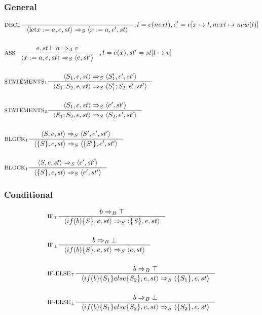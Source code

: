 \subsubsection{General}
\begin{align*}
&\inference[$\text{DECL}$]{}
                         {\Braket{\Tlet x := a,e,st} \Rightarrow_S \Braket{x := a, e',st}}
												{, l = e(next), e' = e[x\mapsto l, next\mapsto new(l)]}
\\\\
&\inference[$\text{ASS}$]{e,st \vdash a \Rightarrow_A v}
                         {\Braket{x := a,e,st} \Rightarrow_S \Braket{e,st'}}
												{, l = e(x), st' = st[l\mapsto v]}
\\\\
&\inference[$\text{STATEMENTS}_1$]{\Braket{S_1,e,st} \Rightarrow_S \Braket{S_1',e',st'}}
                         {\Braket{S_1;S_2,e,st} \Rightarrow_S \Braket{S_1';S_2,e',st'}}
\\\\
&\inference[$\text{STATEMENTS}_2$]{\Braket{S_1,e,st} \Rightarrow_S \Braket{e',st'}}
                         {\Braket{S_1;S_2,e,st} \Rightarrow_S \Braket{S_2,e',st'}}
\\\\
&\inference[$\text{BLOCK}_1$]{\Braket{S,e,st} \Rightarrow_S \Braket{S',e',st'}}
                         {\Braket{\{S\},e,st} \Rightarrow_S \Braket{\{S'\},e',st'}}
\\\\
&\inference[$\text{BLOCK}_1$]{\Braket{S,e,st} \Rightarrow_S \Braket{e',st'}}
                         {\Braket{\{S\},e,st} \Rightarrow_S \Braket{e',st'}}
\end{align*}

\subsubsection{Conditional}
\newcommand{\Tif}{\text{if}}
\newcommand{\Telse}{\text{else}}

\begin{align*}
&\inference[$\text{IF}_\top$]{b \Rightarrow_B \top}
                      {\Braket{if(b)\{S\},e,st} \Rightarrow_S \Braket{\{S\},e,st}}
\\\\
&\inference[$\text{IF}_\bot$]{b \Rightarrow_B \bot}
                      {\Braket{if(b)\{S\},e,st} \Rightarrow_S \Braket{e,st}}
\\\\
&\inference[$\text{IF-ELSE}_\top$]{b \Rightarrow_B \top}
                      {\Braket{if(b)\{S_1\}else\{S_2\},e,st} \Rightarrow_S \Braket{\{S_1\},e,st}}
\\\\
&\inference[$\text{IF-ELSE}_\bot$]{b \Rightarrow_B \bot}
                      {\Braket{if(b)\{S_1\}else\{S_2\},e,st} \Rightarrow_S \Braket{\{S_2\},e,st}}
\end{align*}
